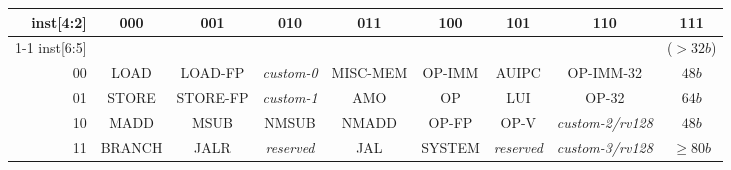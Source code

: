 \vspace{0.1in}
\begin{table*}[htbp]
\begin{center}
{\footnotesize
\setlength{\tabcolsep}{4pt}
\begin{tabular}{|r|c|c|c|c|c|c|c|c|}
  \hline
  inst[4:2] & 000    & 001      & 010            & 011      & 100    & 101            & 110                  & \cellcolor{gray}111 \\ \cline{1-1}
  inst[6:5] &        &          &                &          &        &                &                      & \cellcolor{gray}($>32b$)  \\ \hline
         00 & LOAD   & LOAD-FP  & {\em custom-0} & MISC-MEM & OP-IMM & AUIPC          & OP-IMM-32            & \cellcolor{gray} $48b$\\ \hline
         01 & STORE  & STORE-FP & {\em custom-1} & AMO      & OP     & LUI            & OP-32                & \cellcolor{gray} $64b$ \\ \hline
         10 & MADD   & MSUB     & NMSUB          & NMADD    & OP-FP  & OP-V           & {\em custom-2/rv128} & \cellcolor{gray} $48b$\\ \hline
         11 & BRANCH & JALR     & {\em reserved} & JAL      & SYSTEM & {\em reserved} & {\em custom-3/rv128} & \cellcolor{gray} $\geq80b$\\ \hline

 \end{tabular}
}
\end{center}
\vspace{-0.15in}
\caption{RISC-V base opcode map, inst[1:0]=11}
\label{opcodemap}
\end{table*}
